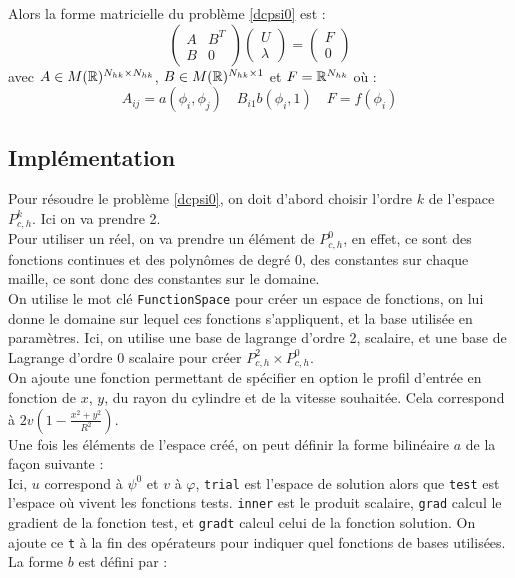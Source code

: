 Alors la forme matricielle du problème \ref{dcpsi0} est :
\[ \begin{pmatrix} A & B^T\\ B & 0\end{pmatrix}\begin{pmatrix}U\\ \lambda\end{pmatrix} = \begin{pmatrix} F\\0 \end{pmatrix} \]
avec $A\in M({\mathbb{R}})^{N_{hk}\times N_{hk}}$, $B\in M({\mathbb{R}})^{N_{hk}\times 1}$ et $F={\mathbb{R}}^{N_{hk}}$ où :
\[ A_{ij} = a(\phi_i,\phi_j)\quad B_{i1} b(\phi_i,1)\quad F=f(\phi_i) \]

\subsection{Implémentation}\label{impGradh1}
Pour résoudre le problème \ref{dcpsi0}, on doit d'abord choisir l'ordre $k$ de l'espace $P_{c,h}^k$. Ici on va prendre 2.\\
Pour utiliser un réel, on va prendre un élément de $P_{c,h}^0$, en effet, ce sont des fonctions continues et des polynômes de degré 0, des constantes sur chaque maille, ce sont donc des constantes sur le domaine.\\
On utilise le mot clé \texttt{FunctionSpace} pour créer un espace de fonctions, on lui donne le domaine sur lequel ces fonctions s'appliquent, et la base utilisée en paramètres. Ici, on utilise une base de lagrange d'ordre 2, scalaire, et une base de Lagrange d'ordre 0 scalaire pour créer $P^2_{c,h}\times P^0_{c,h}$.\\


On ajoute une fonction permettant de spécifier en option le profil d'entrée en fonction de $x$, $y$, du rayon du cylindre et de la vitesse souhaitée. Cela correspond à $2v\left(1-\frac{x^2+y^2}{R^2}\right)$.\\



Une fois les éléments de l'espace créé, on peut définir la forme bilinéaire $a$ de la façon suivante :\\



Ici, $u$ correspond à $\psi^0$ et $v$ à $\varphi$, \texttt{trial} est l'espace de solution alors que \texttt{test} est l'espace où vivent les fonctions tests. \texttt{inner} est le produit scalaire, \texttt{grad} calcul le gradient de la fonction test, et \texttt{gradt} calcul celui de la fonction solution. On ajoute ce \texttt{t} à la fin des opérateurs pour indiquer quel fonctions de bases utilisées.\\
La forme $b$ est défini par :\\


